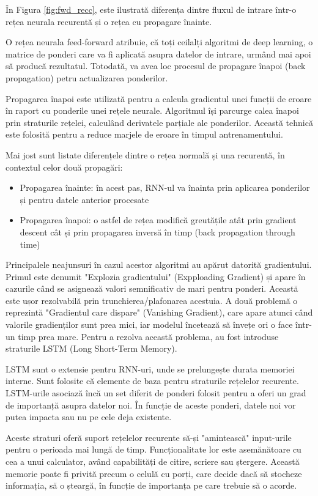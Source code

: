 \documentclass[a4paper, 12pt]{report}
\begin{document}
	În Figura \ref{fig:fwd_recc}, este ilustrată diferența dintre fluxul de intrare într-o rețea neurala recurentă și o rețea cu propagare înainte.
	
	O rețea neurala feed-forward atribuie, că toți ceilalți algoritmi de deep learning, o matrice de ponderi care va fi aplicată asupra datelor de intrare, urmând mai apoi să producă rezultatul. Totodată, va avea loc procesul de propagare înapoi (back propagation) petru actualizarea ponderilor. 
	
	Propagarea înapoi este utilizată pentru a calcula gradientul unei funcții de eroare în raport cu ponderile unei rețele neurale. Algoritmul își parcurge calea înapoi prin straturile rețelei, calculând derivatele parțiale ale ponderilor. Această tehnică este folosită pentru a reduce marjele de eroare în timpul antrenamentului.
	
	Mai jost sunt listate diferențele dintre o rețea normală și una recurentă, în contextul celor două propagări:
	\begin{itemize}
		\item Propagarea înainte: în acest pas, RNN-ul va înainta prin aplicarea ponderilor și pentru datele anterior procesate
		\item Propagarea înapoi: o astfel de rețea modifică greutățile atât prin gradient descent cât și prin propagarea inversă în timp (back propagation through time)
	\end{itemize}
	
	Principalele neajunsuri în cazul acestor algoritmi au apărut datorită gradientului. Primul este denumit "Explozia gradientului" (Expploading Gradient) și apare în cazurile când se asignează valori semnificativ de mari pentru ponderi. Această este ușor rezolvabilă prin trunchierea/plafonarea acestuia. A două problemă o reprezintă "Gradientul care dispare" (Vanishing Gradient), care apare atunci când valorile gradienților sunt prea mici, iar modelul încetează să învețe ori o face într-un timp prea mare. Pentru a rezolva această problema, au fost introduse straturile LSTM (Long Short-Term Memory).
	
	LSTM sunt o extensie pentru RNN-uri, unde se prelungește durata memoriei interne. Sunt folosite că elemente de baza pentru straturile rețelelor recurente. LSTM-urile asociază încă un set diferit de ponderi folosit pentru a oferi un grad de importanță asupra datelor noi. În funcție de aceste ponderi, datele noi vor putea impacta sau nu pe cele deja existente.
	
	Aceste straturi oferă suport rețelelor recurente să-și "amintească" input-urile pentru o perioada mai lungă de timp. Funcționalitate lor este asemănătoare cu cea a unui calculator, având capabilități de citire, scriere sau ștergere. Această memorie poate fi privită precum o celulă cu porți, care decide dacă să stocheze informația, să o șteargă, în funcție de importanța pe care trebuie să o acorde.
	
\end{document}
